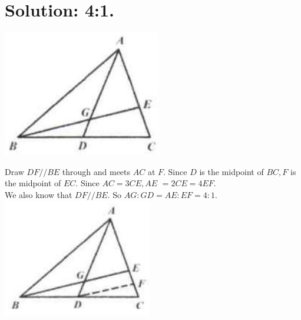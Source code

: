 \documentclass[10pt]{article}
\begin{document}
\section*{Solution: 4:1.}
\begin{center}
\includegraphics[max width=\textwidth]{2025_04_17_97bc1f7e44d93c271a88g-106(3)}
\end{center}

Draw \(D F / / B E\) through and meets \(A C\) at \(F\). Since \(D\) is the midpoint of \(B C, F\) is the midpoint of \(E C\). Since \(A C=3 C E, A E\) \(=2 C E=4 E F\).\\
We also know that \(D F / / B E\). So \(A G: G D=A E: E F=4: 1\).\\
\includegraphics[max width=\textwidth, center]{2025_04_17_97bc1f7e44d93c271a88g-106(2)}
\end{document}
